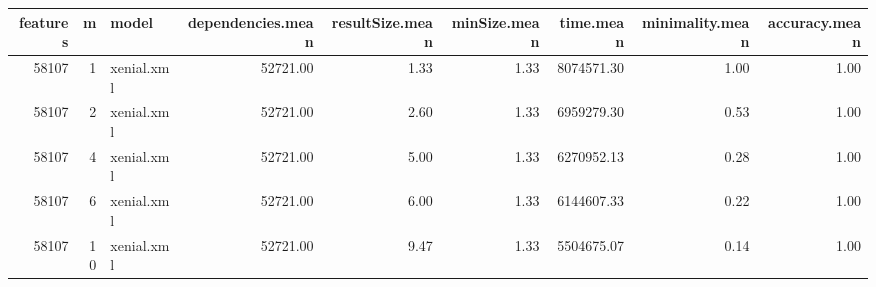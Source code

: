 \begin{table}[ht]
\centering
\begin{tabular}{rrlrrrrrr}
  \hline
features & m & model & dependencies.mean & resultSize.mean & minSize.mean & time.mean & minimality.mean & accuracy.mean \\ 
  \hline
58107 &   1 & xenial.xml & 52721.00 & 1.33 & 1.33 & 8074571.30 & 1.00 & 1.00 \\ 
  58107 &   2 & xenial.xml & 52721.00 & 2.60 & 1.33 & 6959279.30 & 0.53 & 1.00 \\ 
  58107 &   4 & xenial.xml & 52721.00 & 5.00 & 1.33 & 6270952.13 & 0.28 & 1.00 \\ 
  58107 &   6 & xenial.xml & 52721.00 & 6.00 & 1.33 & 6144607.33 & 0.22 & 1.00 \\ 
  58107 &  10 & xenial.xml & 52721.00 & 9.47 & 1.33 & 5504675.07 & 0.14 & 1.00 \\ 
   \hline
\end{tabular}
\end{table}
